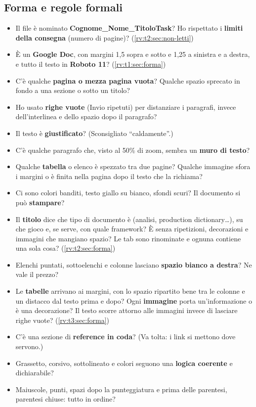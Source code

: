 \subsection{Forma e regole formali}
\begin{itemize}
  \item Il file è nominato \textbf{Cognome\_\allowbreak Nome\_\allowbreak TitoloTask}? Ho
        rispettato i \textbf{limiti della consegna} (numero di pagine)?
        (\ref{rv:t2:sec:non-letti})
  \item È un \textbf{Google Doc}, con margini 1,5 sopra e sotto e 1,25 a
        sinistra e a destra, e tutto il testo in \textbf{Roboto 11}?
        (\ref{rv:t1:sec:forma})
  \item C'è qualche \textbf{pagina o mezza pagina vuota}? Qualche spazio
        sprecato in fondo a una sezione o sotto un titolo?
  \item Ho usato \textbf{righe vuote} (Invio ripetuti) per distanziare i
        paragrafi, invece dell'interlinea e dello spazio dopo il paragrafo?
  \item Il testo è \textbf{giustificato}? (Sconsigliato ``caldamente''.)
  \item C'è qualche paragrafo che, visto al 50\% di zoom, sembra un
        \textbf{muro di testo}?
  \item Qualche \textbf{tabella} o elenco è spezzato tra due pagine?
        Qualche immagine sfora i margini o è finita nella pagina dopo il
        testo che la richiama?
  \item Ci sono colori banditi, testo giallo su bianco, sfondi scuri? Il
        documento si può \textbf{stampare}?
  \item Il \textbf{titolo} dice che tipo di documento è (analisi,
        production dictionary\dots), su che gioco e, se serve, con quale
        framework? È senza ripetizioni, decorazioni e immagini che mangiano
        spazio? Le tab sono rinominate e ognuna contiene una sola cosa?
        (\ref{rv:t2:sec:forma})
  \item Elenchi puntati, sottoelenchi e colonne lasciano \textbf{spazio
        bianco a destra}? Ne vale il prezzo?
  \item Le \textbf{tabelle} arrivano ai margini, con lo spazio ripartito
        bene tra le colonne e un distacco dal testo prima e dopo? Ogni
        \textbf{immagine} porta un'informazione o è una decorazione? Il
        testo scorre attorno alle immagini invece di lasciare righe vuote?
        (\ref{rv:t3:sec:forma})
  \item C'è una sezione di \textbf{reference in coda}? (Va tolta: i link
        si mettono dove servono.)
  \item Grassetto, corsivo, sottolineato e colori seguono una
        \textbf{logica coerente} e dichiarabile?
  \item Maiuscole, punti, spazi dopo la punteggiatura e prima delle
        parentesi, parentesi chiuse: tutto in ordine?
\end{itemize}

